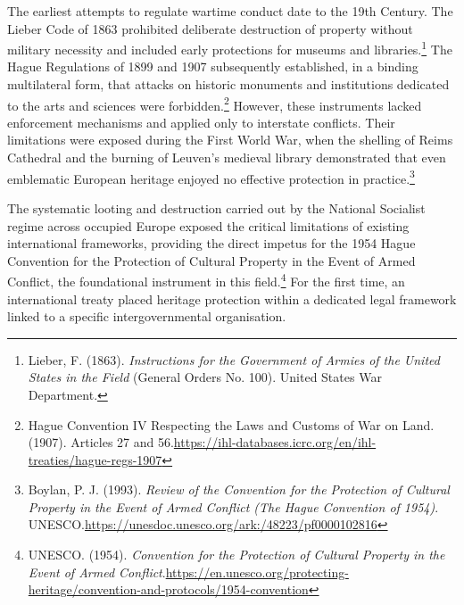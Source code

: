 The earliest attempts to regulate wartime conduct date to the 19th Century. The Lieber Code of 1863 prohibited deliberate destruction of property without military necessity and included early protections for museums and libraries.\footnote{Lieber, F. (1863). \emph{Instructions for the Government of Armies of the United States in the Field} (General Orders No. 100). United States War Department.} The Hague Regulations of 1899 and 1907 subsequently established, in a binding multilateral form, that attacks on historic monuments and institutions dedicated to the arts and sciences were forbidden.\footnote{Hague Convention IV Respecting the Laws and Customs of War on Land. (1907). Articles 27 and 56.\url{https://ihl-databases.icrc.org/en/ihl-treaties/hague-regs-1907}} However, these instruments lacked enforcement mechanisms and applied only to interstate conflicts. Their limitations were exposed during the First World War, when the shelling of Reims Cathedral and the burning of Leuven's medieval library demonstrated that even emblematic European heritage enjoyed no effective protection in practice.\footnote{Boylan, P. J. (1993). \emph{Review of the Convention for the Protection of Cultural Property in the Event of Armed Conflict (The Hague Convention of 1954)}. UNESCO.\url{https://unesdoc.unesco.org/ark:/48223/pf0000102816}}

The systematic looting and destruction carried out by the National Socialist regime across occupied Europe exposed the critical limitations of existing international frameworks, providing the direct impetus for the 1954 Hague Convention for the Protection of Cultural Property in the Event of Armed Conflict, the foundational instrument in this field.\footnote{UNESCO. (1954). \emph{Convention for the Protection of Cultural Property in the Event of Armed Conflict}.\url{https://en.unesco.org/protecting-heritage/convention-and-protocols/1954-convention}} For the first time, an international treaty placed heritage protection within a dedicated legal framework linked to a specific intergovernmental organisation.

